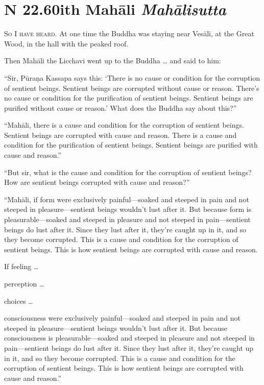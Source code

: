 \documentclass[12pt,openany]{book}%
\newcommand*{\suttatitleacronym}[1]{\smaller[2]{#1}\vspace*{.3em}}
\newcommand*{\suttatitletranslation}[1]{\linebreak{#1}}
\newcommand*{\suttatitleroot}[1]{\linebreak\smaller[2]\itshape{#1}}
\newcommand*{\tocacronym}[1]{\hspace*{-3.3em}{#1}\quad}
\newcommand*{\toctranslation}[1]{#1}
\newcommand*{\tocroot}[1]{(\textit{#1})}
\newcommand*{\scevam}[1]{\textsc{#1}}
\begin{document}
%
\section*{{\suttatitleacronym SN 22.60}{\suttatitletranslation With Mahāli }{\suttatitleroot Mahālisutta}}
\addcontentsline{toc}{section}{\tocacronym{SN 22.60} \toctranslation{With Mahāli } \tocroot{Mahālisutta}}

\scevam{So I have heard. }At one time the Buddha was staying near \textsanskrit{Vesālī}, at the Great Wood, in the hall with the peaked roof. 

Then \textsanskrit{Mahāli} the Licchavi went up to the Buddha … and said to him: 

“Sir, \textsanskrit{Pūraṇa} Kassapa says this: ‘There is no cause or condition for the corruption of sentient beings. Sentient beings are corrupted without cause or reason. There’s no cause or condition for the purification of sentient beings. Sentient beings are purified without cause or reason.’ What does the Buddha say about this?” 

“\textsanskrit{Mahāli}, there is a cause and condition for the corruption of sentient beings. Sentient beings are corrupted with cause and reason. There is a cause and condition for the purification of sentient beings. Sentient beings are purified with cause and reason.” 

“But sir, what is the cause and condition for the corruption of sentient beings? How are sentient beings corrupted with cause and reason?” 

“\textsanskrit{Mahāli}, if form were exclusively painful—soaked and steeped in pain and not steeped in pleasure—sentient beings wouldn’t lust after it. But because form is pleasurable—soaked and steeped in pleasure and not steeped in pain—sentient beings do lust after it. Since they lust after it, they’re caught up in it, and so they become corrupted. This is a cause and condition for the corruption of sentient beings. This is how sentient beings are corrupted with cause and reason. 

If feeling … 

perception … 

choices … 

consciousness were exclusively painful—soaked and steeped in pain and not steeped in pleasure—sentient beings wouldn’t lust after it. But because consciousness is pleasurable—soaked and steeped in pleasure and not steeped in pain—sentient beings do lust after it. Since they lust after it, they’re caught up in it, and so they become corrupted. This is a cause and condition for the corruption of sentient beings. This is how sentient beings are corrupted with cause and reason.” 
\end{document}
